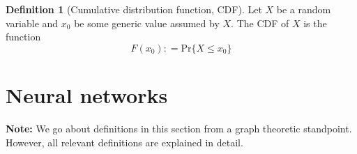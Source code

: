 \documentclass[a4paper, 12pt]{report}
\theoremstyle{definition}
\newtheorem{definition}{Definition}[chapter]
\begin{document}
\begin{definition}[Cumulative distribution function, CDF]
    Let $X$ be a random variable and $x_0$ be some generic value assumed by $X$. The CDF of $X$ is the function
    \[
        F(x_0) \mathrel{:}= \text{Pr}\{X \leq x_0\}
    \]
\end{definition}

\section{Neural networks}
\textbf{Note:} We go about definitions in this section from a graph theoretic standpoint. However, all relevant definitions are explained in detail.
\end{document}
